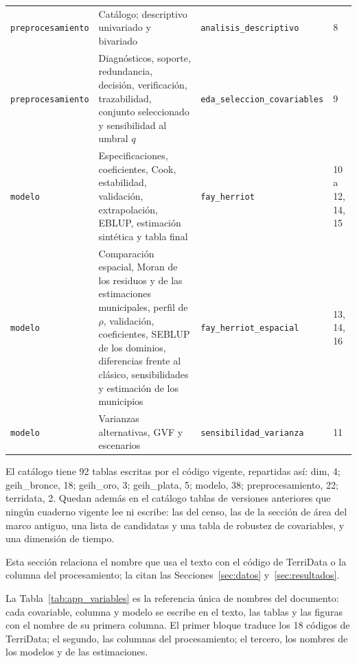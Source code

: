 {\begin{longtable}{p{2.8cm} p{3.6cm} p{4.8cm} p{1.2cm}}
\texttt{preprocesamiento} & Catálogo; descriptivo univariado y bivariado & \texttt{analisis\_descriptivo} & 8 \\
\texttt{preprocesamiento} & Diagnósticos, soporte, redundancia, decisión, verificación, trazabilidad, conjunto seleccionado y sensibilidad al umbral $q$ & \texttt{eda\_seleccion\_covariables} & 9 \\
\texttt{modelo} & Especificaciones, coeficientes, Cook, estabilidad, validación, extrapolación, EBLUP, estimación sintética y tabla final & \texttt{fay\_herriot} & 10 a 12, 14, 15 \\
\texttt{modelo} & Comparación espacial, Moran de los residuos y de las estimaciones municipales, perfil de $\rho$, validación, coeficientes, SEBLUP de los dominios, diferencias frente al clásico, sensibilidades y estimación de los municipios & \texttt{fay\_herriot\_espacial} & 13, 14, 16 \\
\texttt{modelo} & Varianzas alternativas, GVF y escenarios & \texttt{sensibilidad\_varianza} & 11 \\
\end{longtable}
}
El catálogo tiene 92 tablas escritas por el código vigente, repartidas así: dim, 4; geih\_bronce, 18; geih\_oro, 3; geih\_plata, 5; modelo, 38; preprocesamiento, 22; terridata, 2. Quedan además en el catálogo tablas de versiones anteriores que ningún cuaderno vigente lee ni escribe: las del censo, las de la sección de área del marco antiguo, una lista de candidatas y una tabla de robustez de covariables, y una dimensión de tiempo.

\label{app:variables}

Esta sección relaciona el nombre que usa el texto con el código de TerriData o la columna del procesamiento; la citan las Secciones~\ref{sec:datos} y~\ref{sec:resultados}.

La Tabla~\ref{tab:app_variables} es la referencia única de nombres del documento: cada covariable, columna y modelo se escribe en el texto, las tablas y las figuras con el nombre de su primera columna. El primer bloque traduce los 18 códigos de TerriData; el segundo, las columnas del procesamiento; el tercero, los nombres de los modelos y de las estimaciones.

